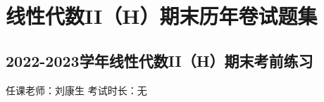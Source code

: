 \chapter*{线性代数II（H）期末历年卷试题集}

\section*{2022-2023学年线性代数II（H）期末考前练习}

\begin{center}
    任课老师：刘康生\hspace{4em} 考试时长：无
\end{center}

